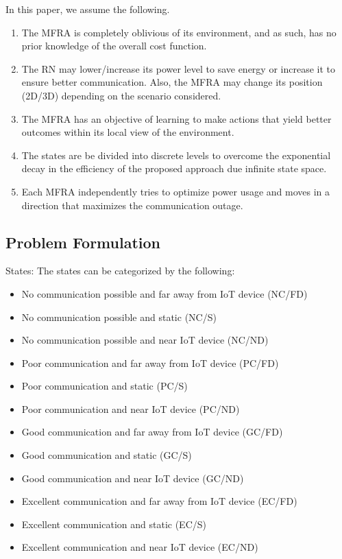 \documentclass[journal]{IEEEtran}
\begin{document}
In this paper, we assume the following.
\begin{enumerate}
  \item The MFRA is completely oblivious of its environment, and as such, has no prior knowledge of the overall cost function.
  \item The RN may lower/increase its power level to save energy or increase it to ensure better communication. Also, the MFRA may change its position (2D/3D) depending on the scenario considered.
  \item The MFRA has an objective of learning to make actions that yield better outcomes within its local view of the environment.
  \item The states are be divided into discrete levels to overcome the exponential decay in the efficiency of the proposed approach due infinite state space.
  \item Each MFRA independently tries to optimize power usage and moves in a direction that maximizes the communication outage.
\end{enumerate}





\subsection{Problem Formulation}
States: The states can be categorized by the following:
\begin{itemize}
  \item No communication possible and far away from IoT device (NC/FD)
  \item No communication possible and static (NC/S)
  \item No communication possible and near IoT device (NC/ND)
  \item Poor communication and far away from IoT device (PC/FD)
  \item Poor communication and static (PC/S)
  \item Poor communication and near IoT device (PC/ND)
  \item Good communication and far away from IoT device (GC/FD)
  \item Good communication and static (GC/S)
  \item Good communication and near IoT device (GC/ND)
  \item Excellent communication and far away from IoT device (EC/FD)
  \item Excellent communication and static (EC/S)
  \item Excellent communication and near IoT device (EC/ND)
\end{itemize}
\end{document}
